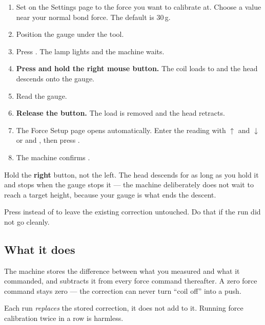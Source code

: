 \begin{enumerate}[leftmargin=*]
\item Set  on the Settings page to the force you want to
  calibrate at. Choose a value near your normal bond force. The default is
  30\,g.
\item Position the gauge under the tool.
\item Press . The  lamp lights and the machine
  waits.
\item \textbf{Press and hold the right mouse button.} The coil loads to
   and the head descends onto the gauge.
\item Read the gauge.
\item \textbf{Release the button.} The load is removed and the head retracts.
\item The Force Setup page opens automatically. Enter the reading with
  $\uparrow$ and $\downarrow$ or \keycap{$+$} and \keycap{$-$}, then press
  .
\item The machine confirms .
\end{enumerate}

\begin{wbnote}
Hold the \textbf{right} button, not the left. The head descends for as long as
you hold it and stops when the gauge stops it --- the machine deliberately does
not wait to reach a target height, because your gauge is what ends the
descent.
\end{wbnote}

\begin{wbnote}
Press  instead of  to leave the existing
correction untouched. Do that if the run did not go cleanly.
\end{wbnote}

\subsection*{What it does}

The machine stores the difference between what you measured and what it
commanded, and subtracts it from every force command thereafter. A zero force
command stays zero --- the correction can never turn ``coil off'' into a push.

\begin{wbnote}
Each run \emph{replaces} the stored correction, it does not add to it. Running
force calibration twice in a row is harmless.
\end{wbnote}

